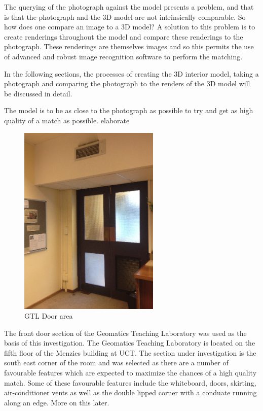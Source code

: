 \documentclass[11pt,a4paper]{report}
\begin{document}
	The querying of the photograph against the model presents a problem, and that is that the photograph and the 3D model are not intrinsically comparable. So how does one compare an image to a 3D model? A solution to this problem is to create renderings throughout the model and compare these renderings to the photograph. These renderings are themselves images and so this permits the use of advanced and robust image recognition software to perform the matching.
	
	In the following sections, the processes of creating the 3D interior model, taking a photograph and comparing the photograph to the renders of the 3D model will be discussed in detail.
	
	The model is to be as close to the photograph as possible to try and get as high quality of a match as possible. {{elaborate}}
	
	\begin{figure}[h!]
		\centering
		\includegraphics[width=0.6\textwidth]{gtl_door_area}
		\caption{GTL Door area}
	\end{figure}
	
	The front door section of the Geomatics Teaching Laboratory was used as the basis of this investigation. The Geomatics Teaching Laboratory is located on the fifth floor of the Menzies building at UCT. The section under investigation is the south east corner of the room and was selected as there are a number of favourable features which are expected to maximize the chances of a high quality match. Some of these favourable features include the whiteboard, doors, skirting, air-conditioner vents as well as the double lipped corner with a conduate running along an edge. More on this later.
	
\end{document}
